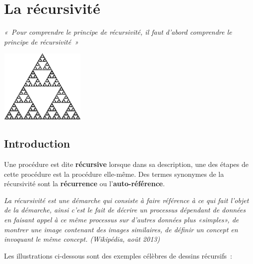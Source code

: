 \chapter{La récursivité}

{\itshape «~Pour comprendre le principe de récursivité, 
il faut d'abord comprendre le principe de récursivité~»}

\begin{center}
	\includegraphics[width=4.094cm,height=3.519cm]{image/a2012Logique2eme-img015.png}
\end{center}
	

\section{Introduction}
	
	Une procédure est dite \textbf{récursive} lorsque dans sa description, 
	une des étapes de cette procédure est la procédure elle-même. 
	Des termes synonymes de la récursivité sont la \textbf{récurrence} 
	ou l'\textbf{auto-référence}.
	
	\textit{La récursivité est une démarche qui consiste à faire 
	référence à ce qui fait l'objet de la démarche, ainsi c'est
	le fait de décrire un processus dépendant de données en faisant 
	appel à ce même processus sur d'autres données plus
	«simples», de montrer une image contenant des images similaires, 
	de définir un concept en invoquant le même concept.
	(Wikipédia, août 2013)}

	Les illustrations ci-dessous sont des exemples célèbres 
	de dessins récursifs~:

